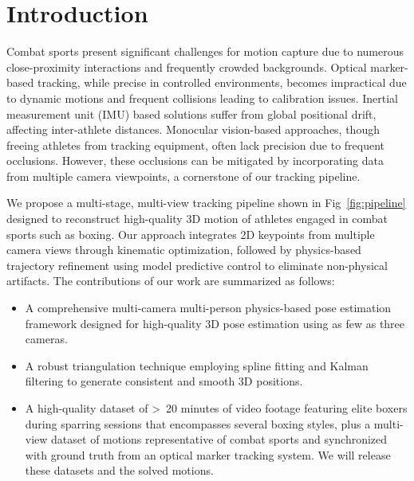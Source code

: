 \documentclass{egpubl}
\begin{document}
\section{Introduction}
Combat sports present significant challenges for motion capture due to numerous close-proximity interactions and frequently crowded backgrounds. Optical marker-based tracking, while precise in controlled environments, becomes impractical due to dynamic motions and frequent collisions leading to calibration issues. Inertial measurement unit (IMU) based solutions suffer from global positional drift, affecting inter-athlete distances. Monocular vision-based approaches, though freeing athletes from tracking equipment, often lack precision due to frequent occlusions. However, these occlusions can be mitigated by incorporating data from multiple camera viewpoints, a cornerstone of our tracking pipeline.

We propose a multi-stage, multi-view tracking pipeline shown in Fig~\ref{fig:pipeline} designed to reconstruct high-quality 3D motion of athletes engaged in combat sports such as boxing. Our approach integrates 2D keypoints from multiple camera views through kinematic optimization, followed by physics-based trajectory refinement using model predictive control to eliminate non-physical artifacts. 
The contributions of our work are summarized as follows:
\begin{itemize}
    \item A comprehensive multi-camera multi-person physics-based pose estimation framework designed for high-quality 3D pose estimation using as few as three cameras.
    \item A robust triangulation technique employing spline fitting and Kalman filtering to generate consistent and smooth 3D positions.
    \item A high-quality dataset of >~20 minutes of video footage featuring elite boxers during sparring sessions that encompasses several boxing styles, plus a multi-view dataset of motions representative of combat sports and synchronized with ground truth from an optical marker tracking system. We will release these datasets and the solved motions.
\end{itemize}



\label{sec:results} 


  
\end{document}
